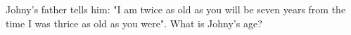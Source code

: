 Johny's father tells him: "I am twice as old as you will be seven years from the time I was thrice as old as you were". What is Johny's age?